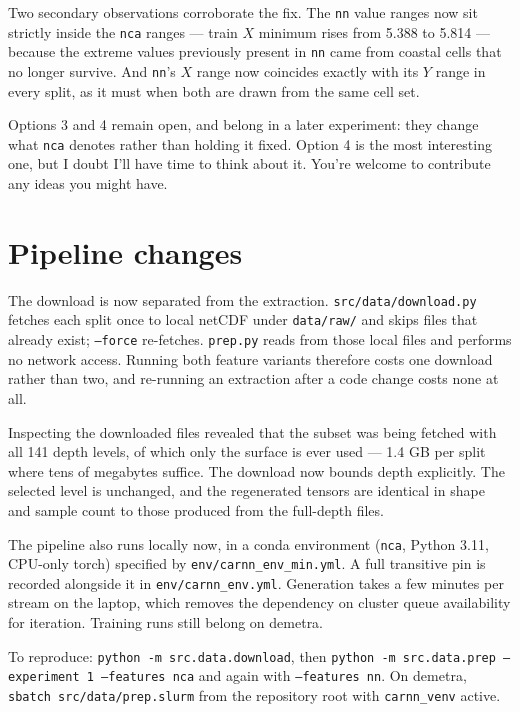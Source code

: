 \documentclass[11pt]{amsart}
\begin{document}
Two secondary observations corroborate the fix. The \texttt{nn} value ranges now
sit strictly inside the \texttt{nca} ranges --- train $X$ minimum rises from
5.388 to 5.814 --- because the extreme values previously present in \texttt{nn}
came from coastal cells that no longer survive. And \texttt{nn}'s $X$ range now
coincides exactly with its $Y$ range in every split, as it must when both are
drawn from the same cell set.

Options 3 and 4 remain open, and belong in a later experiment: they change what
\texttt{nca} denotes rather than holding it fixed. Option 4 is the most
interesting one, but I doubt I'll have time to think about it. You're welcome to
contribute any ideas you might have.

\section{Pipeline changes}

The download is now separated from the extraction. \texttt{src/data/download.py}
fetches each split once to local netCDF under \texttt{data/raw/} and skips files
that already exist; \texttt{--force} re-fetches. \texttt{prep.py} reads from
those local files and performs no network access. Running both feature variants
therefore costs one download rather than two, and re-running an extraction after
a code change costs none at all.

Inspecting the downloaded files revealed that the subset was being fetched with
all 141 depth levels, of which only the surface is ever used --- 1.4 GB per split
where tens of megabytes suffice. The download now bounds depth explicitly. The
selected level is unchanged, and the regenerated tensors are identical in shape
and sample count to those produced from the full-depth files.

The pipeline also runs locally now, in a conda environment (\texttt{nca},
Python 3.11, CPU-only torch) specified by \texttt{env/carnn\_env\_min.yml}. A
full transitive pin is recorded alongside it in \texttt{env/carnn\_env.yml}.
Generation takes a few minutes per stream on the laptop, which removes the
dependency on cluster queue availability for iteration. Training runs still
belong on demetra.

To reproduce: \texttt{python -m src.data.download}, then
\texttt{python -m src.data.prep --experiment 1 --features nca} and again with
\texttt{--features nn}. On demetra, \texttt{sbatch src/data/prep.slurm} from the
repository root with \texttt{carnn\_venv} active.
\end{document}

